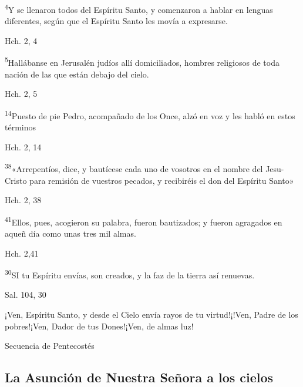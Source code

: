 \documentclass[a4paper,11pt]{article}
\begin{document}
      \textsuperscript{4}Y se llenaron todos del Espíritu Santo, y comenzaron a hablar en lenguas diferentes, según que el Espíritu Santo les movía
      a expresarse.
      \begin{flushright}
        Hch. 2, 4
      \end{flushright}

      \textsuperscript{5}Hallábanse en Jerusalén judíos allí domiciliados, hombres religiosos de toda nación de las que están debajo del cielo.
      \begin{flushright}
        Hch. 2, 5
      \end{flushright}

      \textsuperscript{14}Puesto de pie Pedro, acompañado de los Once, alzó en voz y les habló en estos términos
      \begin{flushright}
        Hch. 2, 14
      \end{flushright}

      \textsuperscript{38}«Arrepentíos, dice, y bautícese cada uno de vosotros en el nombre del Jesu-Cristo para remisión de vuestros pecados, y recibiréis el don
      del Espíritu Santo»
      \begin{flushright}
        Hch. 2, 38
      \end{flushright}

      \textsuperscript{41}Ellos, pues, acogieron su palabra, fueron bautizados; y fueron agragados en aqueñ día como unas tres mil almas.
      \begin{flushright}
        Hch. 2,41
      \end{flushright}

      \textsuperscript{30}SI tu Espíritu envías, son creados, y la faz de la tierra así renuevas.
      \begin{flushright}
        Sal. 104, 30
      \end{flushright}

      ¡Ven, Espíritu Santo, y desde el Cielo envía rayos de tu virtud!¡!Ven, Padre de los pobres!¡Ven, Dador de tus Dones!¡Ven, de almas luz!
      \begin{flushright}
        Secuencia de Pentecostés
      \end{flushright}

    \subsection*{\hfil La Asunción de Nuestra Señora a los cielos \hfil}
\end{document}
